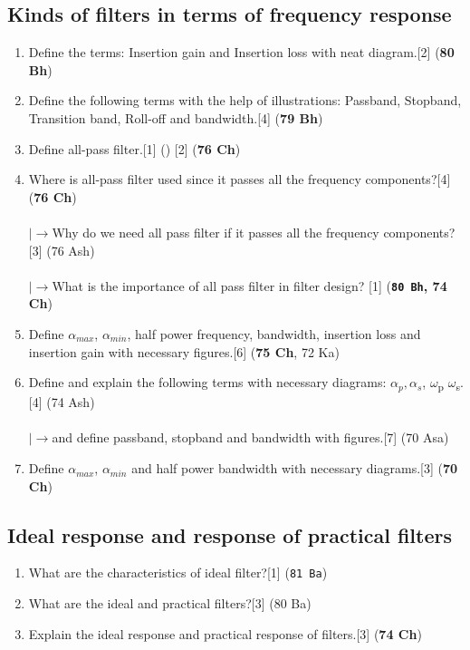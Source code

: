 \documentclass[12pt]{article}
\newcommand{\w}{\(\omega\)}
\newcommand{\lb}{\\$\left|\rightarrow\right.$}
\begin{document}
	\subsection{Kinds of filters in terms of frequency response}
	\begin{enumerate}
	\item Define the terms: Insertion gain and Insertion loss with neat diagram.\hfill[2] (\textbf{80 Bh})
	\item Define the following terms with the help of illustrations: Passband, Stopband, Transition band, Roll-off and bandwidth.\hfill[4] (\textbf{79 Bh})
	\item Define all-pass filter.\hfill[1] () [2] (\textbf{76 Ch})
	\item Where is all-pass filter used since it passes all the frequency components?\hfill[4] (\textbf{76 Ch})\\
	\lb Why do we need all pass filter if it passes all the frequency components?\hfill[3] (76 Ash)\\
	\lb  What is the importance of all pass filter in filter design? \hfill [1] (\textbf{\texttt{80 Bh}, 74 Ch})
	\item Define $\alpha_{max}$, $\alpha_{min}$, half power frequency, bandwidth, insertion loss and insertion gain with necessary figures.\hfill[6] (\textbf{75 Ch}, 72 Ka)
	\item Define and explain the following terms with necessary diagrams: $\alpha_p, \alpha_s$, \w\textsubscript{p} \w\textsubscript{s}.\hfill[4] (74 Ash)\\
	\lb and define passband, stopband and bandwidth with figures.\hfill[7] (70 Asa)
	\item Define $\alpha_{max}$, $\alpha_{min}$ and half power bandwidth with necessary diagrams.\hfill[3] (\textbf{70 Ch})
	\end{enumerate}
	\subsection{Ideal response and response of practical filters}
	\begin{enumerate}
	\item What are the characteristics of ideal filter?\hfill[1] (\texttt{81 Ba})
	\item What are the ideal and practical filters?\hfill[3] (80 Ba)
	\item Explain the ideal response and practical response of filters.\hfill[3] (\textbf{74 Ch})
	\end{enumerate}
\end{document}
